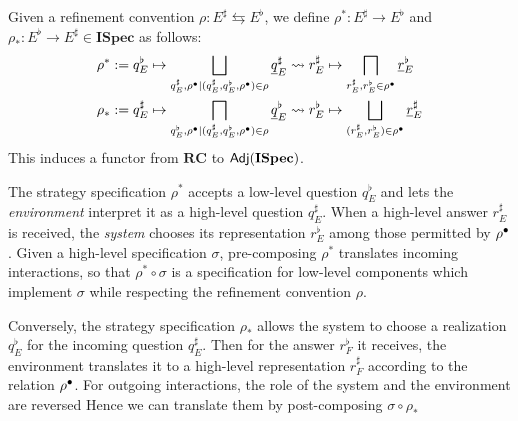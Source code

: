 \documentclass[acmsmall,review,anonymous]{acmart}\settopmatter{printfolios=true,printccs=false,printacmref=false}
\newcommand{\ISpec}{\mathbf{ISpec}}
\begin{document}
\begin{definition}
Given a refinement convention $\rho : E^\sharp \leftrightarrows E^\flat$,
we define
$\rho^* : E^\sharp \rightarrow E^\flat$ and
$\rho_* : E^\flat \rightarrow E^\sharp \in \ISpec$ as follows:
\begin{align*}
  \rho^* &:= q_E^\flat \mapsto
    \bigsqcup_{q_E^\sharp, \rho^\bullet
           \mid (q_E^\sharp, q_E^\flat, \rho^\bullet) \in \rho}
    \underline{q}_E^\sharp \leadsto r_E^\sharp \mapsto
    \bigsqcap_{r_E^\sharp, r_E^\flat \in \rho^\bullet}
    \underline{r}_E^\flat
  \\
  \rho_* &:= q_E^\sharp \mapsto
    \bigsqcap_{q_E^\flat, \rho^\bullet
           \mid (q_E^\sharp, q_E^\flat, \rho^\bullet) \in \rho}
    \underline{q}_E^\flat \leadsto r_E^\flat \mapsto
    \bigsqcup_{(r_E^\sharp, r_E^\flat) \in \rho^\bullet}
    \underline{r}_E^\sharp
\end{align*}
This induces a functor from $\mathbf{RC}$ to $\kw{Adj}(\ISpec)$.
\end{definition}

The strategy specification $\rho^*$
accepts a low-level question $q_E^\flat$ %
and lets the \emph{environment} interpret it as
a high-level question $q_E^\sharp$. %
When a high-level answer $r_E^\sharp$ is received, %
the \emph{system} chooses
its representation $r_E^\flat$ %
among those permitted by $\rho^\bullet$.
Given a high-level specification $\sigma$,
pre-composing $\rho^*$ translates incoming interactions,
so that $\rho^* \circ \sigma$
is a specification for low-level components
which implement $\sigma$
while respecting the refinement convention $\rho$.

Conversely,
the strategy specification $\rho_*$
allows the system to choose
a realization $q_E^\flat$
for the incoming question $q_E^\sharp$.
Then for the answer $r_F^\flat$ it receives,
the environment translates it
to a high-level representation $r_F^\sharp$
according to the relation $\rho^\bullet$.
For outgoing interactions,
the role of the system and the environment are reversed
Hence we can translate them
by post-composing $\sigma \circ \rho_*$
\end{document}
